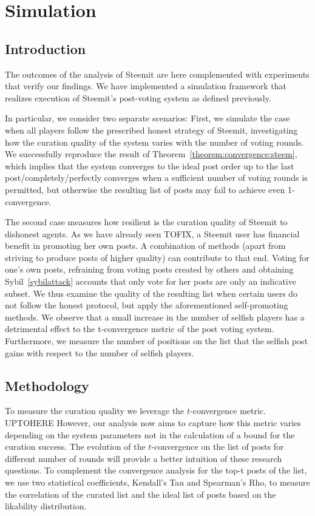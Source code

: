 \section{Simulation}
  \subsection{Introduction}
    The outcomes of the analysis of Steemit are here complemented with
    experiments that verify our findings. We have implemented a simulation
    framework that realizes execution of Steemit's post-voting system as defined
    previously.

    In particular, we consider two separate scenarios: First, we simulate the
    case when all players follow the prescribed honest strategy of Steemit,
    investigating how the curation quality of the system varies with the number
    of voting rounds. We successfully reproduce the result of
    Theorem~\ref{theorem:convergence:steem}, which implies that the system
    converges to the ideal post order up to the last post/completely/perfectly
    converges when a sufficient number of voting rounds is permitted, but
    otherwise the resulting list of posts may fail to achieve even
    1-convergence.

    The second case measures how resilient is the curation quality of Steemit to
    dishonest agents. As we have already seen TOFIX, a Steemit user has
    financial benefit in promoting her own posts. A combination of methods
    (apart from striving to produce posts of higher quality) can contribute to
    that end.  Voting for one's own posts, refraining from voting posts created
    by others and obtaining Sybil~\ref{sybilattack} accounts that only vote for
    her posts are only an indicative subset. We thus examine the quality of the
    resulting list when certain users do not follow the honest protocol, but
    apply the aforementioned self-promoting methods. We observe that a small
    increase in the number of selfish players has a detrimental effect to the
    t-convergence metric of the post voting system. Furthermore, we measure the
    number of positions on the list that the selfish post gains with respect to
    the number of selfish players.

  \subsection{Methodology}
    To measure the curation quality we leverage the $t$-convergence metric.
    UPTOHERE However, our analysis now aims to capture how this metric varies
    depending on the system parameters not in the calculation of a bound for the
    curation success. The evolution of the $t$-convergence on the list of posts
    for different number of rounds will provide a better intuition of these
    research questions. To complement the convergence analysis for the top-t
    posts of the list, we use two statistical coefficients, Kendall's Tau and
    Spearman's Rho, to measure the correlation of the curated list and the ideal
    list of posts based on the likability distribution.

